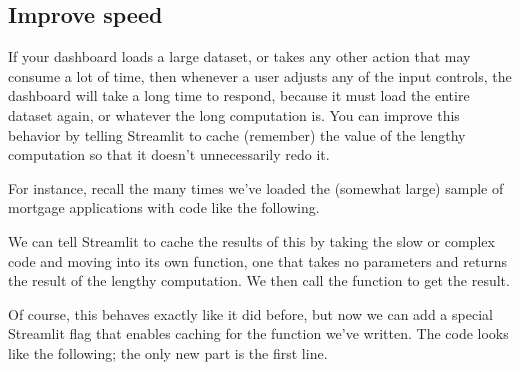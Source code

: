 \documentclass[letterpaper,10pt,english]{sphinxmanual}
\begin{document}


\subsection{Improve speed}
\label{\detokenize{chapter-14-dashboards:improve-speed}}
If your dashboard loads a large dataset, or takes any other action that may consume a lot of time, then whenever a user adjusts any of the input controls, the dashboard will take a long time to respond, because it must load the entire dataset again, or whatever the long computation is.  You can improve this behavior by telling Streamlit to cache (remember) the value of the lengthy computation so that it doesn’t unnecessarily redo it.

For instance, recall the many times we’ve loaded the (somewhat large) sample of mortgage applications with code like the following.

\begin{sphinxVerbatim}[commandchars=\\\{\}]
    
\end{sphinxVerbatim}

We can tell Streamlit to cache the results of this by taking the slow or complex code and moving into its own function, one that takes no parameters and returns the result of the lengthy computation.  We then call the function to get the result.

\begin{sphinxVerbatim}[commandchars=\\\{\}]
  
       

  
\end{sphinxVerbatim}

Of course, this behaves exactly like it did before, but now we can add a special Streamlit flag that enables caching for the function we’ve written.  The code looks like the following; the only new part is the first line.
\end{document}
